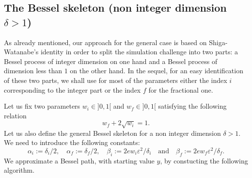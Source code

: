 \documentclass[12pt]{article}
\numberwithin{equation}{section}
\begin{document}
\subsection*{The Bessel skeleton (non integer dimension $\delta>1$)}
 As already mentioned, our approach for the general case is based on Shiga-Watanabe's identity in order to split the simulation challenge into two parts: a Bessel process of integer dimension on one hand and a Bessel process of dimension less than $1$ on the other hand. In the sequel, for an easy identification of these two parts, we shall use for most of the parameters either the index $i$ corresponding to the integer part or the index $f$ for the fractional one. 

Let us fix two parameters $w_i\in]0,1[$ and $w_f\in]0,1[$ satisfying the following relation
\begin{equation}
\label{eq:relw}
w_f+2\sqrt{w_i}=1.
\end{equation}
Let us also define the general Bessel skeleton for a non integer dimension $\delta>1$. We need to introduce the following constants:
\[
\alpha_i:=\delta_i/2,\quad \alpha_f:=\delta_f/2, \quad \beta_i:=2ew_i\varepsilon^2/\delta_i
 \quad \mbox{and}\quad \beta_f:=2ew_f\varepsilon^2/\delta_f.
\]
%
We approximate a Bessel path, with starting value $y$, by constucting the following algorithm.
\end{document}
